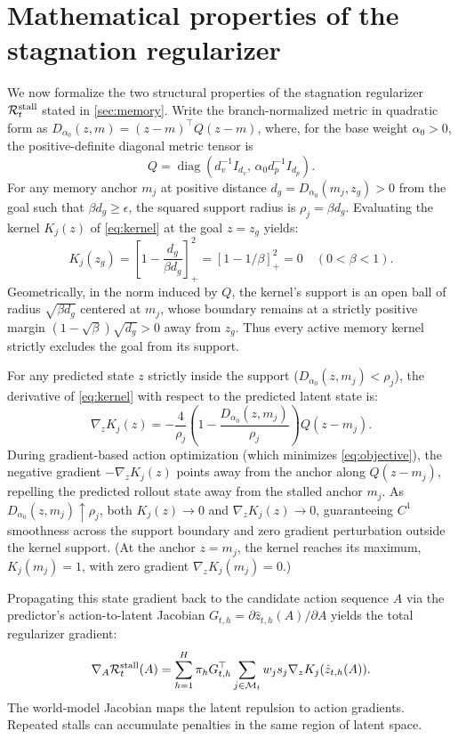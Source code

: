 \section{Mathematical properties of the stagnation regularizer}
\label{sec:properties}
We now formalize the two structural properties of the stagnation regularizer $\mathcal R_t^{\rm stall}$ stated in \cref{sec:memory}. Write the branch-normalized metric in quadratic form as $D_{\alpha_0}(z,m)=(z-m)^\top Q(z-m)$, where, for the base weight $\alpha_0>0$, the positive-definite diagonal metric tensor is
\begin{equation}
 Q=\operatorname{diag}\!\left(d_v^{-1}I_{d_v},\,
 \alpha_0d_p^{-1}I_{d_p}\right).
\end{equation}
For any memory anchor $m_j$ at positive distance $d_g=D_{\alpha_0}(m_j,z_g)>0$ from the goal such that $\beta d_g\geq\epsilon$, the squared support radius is $\rho_j=\beta d_g$. Evaluating the kernel $K_j(z)$ of \cref{eq:kernel} at the goal $z=z_g$ yields:
\begin{equation}
 K_j(z_g)=\left[1-\frac{d_g}{\beta d_g}\right]_+^2=[1-1/\beta]_+^2=0\quad(0<\beta<1).
\end{equation}
Geometrically, in the norm induced by $Q$, the kernel's support is an open ball of radius $\sqrt{\beta d_g}$ centered at $m_j$, whose boundary remains at a strictly positive margin $(1-\sqrt{\beta})\sqrt{d_g}>0$ away from $z_g$. Thus every active memory kernel strictly excludes the goal from its support.

For any predicted state $z$ strictly inside the support ($D_{\alpha_0}(z,m_j)<\rho_j$), the derivative of \cref{eq:kernel} with respect to the predicted latent state is:
\begin{equation}
 \nabla_zK_j(z)=-\frac{4}{\rho_j}
 \left(1-\frac{D_{\alpha_0}(z,m_j)}{\rho_j}\right)Q(z-m_j).
 \label{eq:kernelgradient}
\end{equation}
During gradient-based action optimization (which minimizes \cref{eq:objective}), the negative gradient $-\nabla_z K_j(z)$ points away from the anchor along $Q(z-m_j)$, repelling the predicted rollout state away from the stalled anchor $m_j$. As $D_{\alpha_0}(z,m_j)\uparrow\rho_j$, both $K_j(z)\to 0$ and $\nabla_z K_j(z)\to 0$, guaranteeing $C^1$ smoothness across the support boundary and zero gradient perturbation outside the kernel support. (At the anchor $z=m_j$, the kernel reaches its maximum, $K_j(m_j)=1$, with zero gradient $\nabla_z K_j(m_j)=0$.)

Propagating this state gradient back to the candidate action sequence $A$ via the predictor's action-to-latent Jacobian $G_{t,h}=\partial\hat z_{t,h}(A)/\partial A$ yields the total regularizer gradient:
\begin{equation}
 \nabla_A\mathcal R_t^{\rm stall}(A)=
 \sum_{h=1}^{H}\pi_h G_{t,h}^{\top}
 \sum_{j\in\mathcal M_t}w_js_j\nabla_zK_j(\hat z_{t,h}(A)).
\end{equation}
The world-model Jacobian maps the latent repulsion to action gradients. Repeated stalls can accumulate penalties in the same region of latent space.

